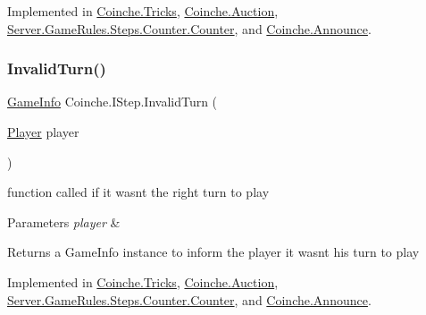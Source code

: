 Implemented in \hyperlink{class_coinche_1_1_tricks_ae9cd4602740f7612010fac07af2997a8}{Coinche.\+Tricks}, \hyperlink{class_coinche_1_1_auction_ac43279f6867bd7896aee8e6ae504c472}{Coinche.\+Auction}, \hyperlink{class_server_1_1_game_rules_1_1_steps_1_1_counter_1_1_counter_aba717018db3366659fdb4ac302d19937}{Server.\+Game\+Rules.\+Steps.\+Counter.\+Counter}, and \hyperlink{class_coinche_1_1_announce_acf172bfff869b6e3f63ac4a18de63a55}{Coinche.\+Announce}.

\mbox{\label{interface_coinche_1_1_i_step_afc64813670860f5ee0829264751abc0a}} 
\subsubsection{\texorpdfstring{Invalid\+Turn()}{InvalidTurn()}}
{\footnotesize\ttfamily \hyperlink{class_coinche_1_1_tools_1_1_game_info}{Game\+Info} Coinche.\+I\+Step.\+Invalid\+Turn (\begin{DoxyParamCaption}\item[{\hyperlink{class_coinche_1_1_player}{Player}}]{player }\end{DoxyParamCaption})}



function called if it wasn\textquotesingle{}t the right turn to play 


\begin{DoxyParams}{Parameters}
{\em player} & \\
\hline
\end{DoxyParams}
\begin{DoxyReturn}{Returns}
a Game\+Info instance to inform the player it wasn\textquotesingle{}t his turn to play
\end{DoxyReturn}


Implemented in \hyperlink{class_coinche_1_1_tricks_a298a3f9c18af5a9e2ab7da3c7509075a}{Coinche.\+Tricks}, \hyperlink{class_coinche_1_1_auction_a00eba97a2289eb3bf7b2f4f7c84c8349}{Coinche.\+Auction}, \hyperlink{class_server_1_1_game_rules_1_1_steps_1_1_counter_1_1_counter_a81fc65a550bef61081dd1ec351b3bdaf}{Server.\+Game\+Rules.\+Steps.\+Counter.\+Counter}, and \hyperlink{class_coinche_1_1_announce_a778b04cb7ff3405d1a182e445a7c8f4c}{Coinche.\+Announce}.

\mbox{\label{interface_coinche_1_1_i_step_ada17a0e471c5afbc7e4f4acc434cdd76}} 
